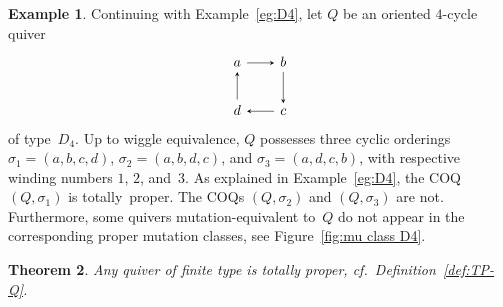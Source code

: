 \documentclass[11pt, letterpaper]{amsart}
\newtheorem{theorem}{Theorem}[section]
\theoremstyle{definition}
\newtheorem{example}[theorem]{Example}
\numberwithin{equation}{section}
\begin{document}
\begin{example}
Continuing with Example~\ref{eg:D4}, 
let $Q$ be an oriented $4$-cycle quiver 
\begin{equation*}
\begin{tikzcd}[arrows={-stealth}, sep=2em]
  a  \arrow[r] & b \arrow[d]  \\
 d\arrow[u]  & c   \arrow[l] 
\end{tikzcd}
\end{equation*}
of type~$D_4$. 
Up to wiggle equivalence, $Q$ possesses three cyclic orderings 
$\sigma_1=(a, b, c, d)$, $\sigma_2=(a,b,d,c)$, and $\sigma_3=(a, d, c, b)$,
with respective winding numbers $1$, $2$, and~$3$. 
%
As explained in Example~\ref{eg:D4}, 
the COQ $(Q,\sigma_1)$ is totally~proper. 
The COQs $(Q,\sigma_2)$ and $(Q,\sigma_3)$ are not.
Furthermore, some quivers mutation-equivalent to~$Q$ do not appear in the corresponding proper mutation classes,
see Figure~\ref{fig:mu class D4}. 
\end{example}

\begin{theorem}
\label{thm:finite type}
Any quiver of finite type is totally proper, cf.\ Definition~\ref{def:TP-Q}. 
\end{theorem}
\end{document}
